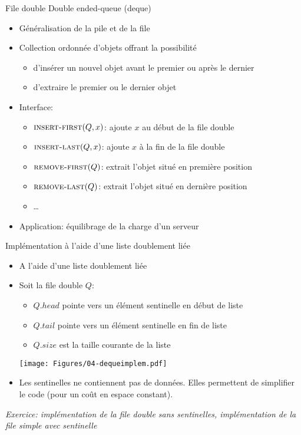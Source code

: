 \begin{frame}{File double}
Double ended-queue (deque)

\bigskip

\begin{itemize}
\item Généralisation de la pile et de la file
\item Collection ordonnée d'objets offrant la possibilité
\begin{itemize}
\item d'insérer un nouvel objet \alert{avant le premier} ou \alert{après le dernier}
\item d'extraire le \alert{premier} ou le \alert{dernier} objet
\end{itemize}
\item Interface:
\begin{itemize}
\item $\textnormal{\scshape insert-first}(Q,x)$: ajoute $x$ au début de la file double
\item $\textnormal{\scshape insert-last}(Q,x)$: ajoute $x$ à la fin de la file double
\item $\textnormal{\scshape remove-first}(Q)$: extrait l'objet situé en première position
\item $\textnormal{\scshape remove-last}(Q)$: extrait l'objet situé en dernière position
\item \ldots
\end{itemize}
\item Application: équilibrage de la charge d'un serveur
\end{itemize}

\end{frame}

\begin{frame}{Implémentation à l'aide d'une liste doublement liée}
\begin{itemize}
\item A l'aide d'une liste doublement liée
\item Soit la file double $Q$:
\begin{itemize}
\item $Q.head$ pointe vers un élément \alert{sentinelle} en début de liste
\item $Q.tail$ pointe vers un élément \alert{sentinelle} en fin de liste
\item $Q.size$ est la taille courante de la liste
\end{itemize}

\centerline{\texttt{[image: Figures/04-dequeimplem.pdf]}}

\item Les sentinelles ne contiennent pas de données. Elles permettent
  de simplifier le code (pour un coût en espace constant).
\end{itemize}

\bigskip

{\it Exercice: implémentation de la file double sans
  sentinelles, implémentation de la file simple avec sentinelle}

\end{frame}

